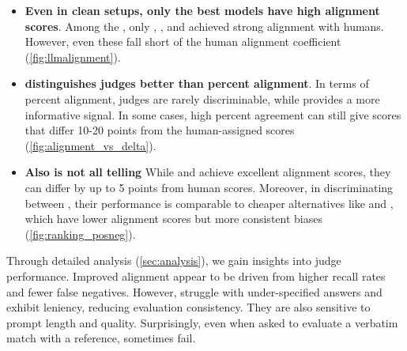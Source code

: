 \begin{itemize}[leftmargin=4pt, topsep=1pt, itemsep=0.1em] %
    \item \textbf{Even in clean setups, only the best models have high alignment scores}. Among the \njudgesword \judgemodels, only \judge{\gpt}, , and  achieved strong alignment with humans. However, even these fall short of the human alignment coefficient (\cref{fig:llmalignment}). %
\\
\item \textbf{\scottspi distinguishes judges better than percent alignment}. In terms of percent alignment, judges are rarely discriminable, while \scottspi provides a more informative signal. In some cases, high percent agreement can still give scores that differ 10-20 points from the human-assigned scores (\cref{fig:alignment_vs_delta}). %

\item \textbf{Also \scottspi is not all telling} While \judge{\gpt} and  achieve excellent alignment scores, they can differ by up to 5 points from human scores. Moreover, in discriminating between \evaluatormodels, their performance is comparable to cheaper alternatives like  and , which have lower alignment scores but more consistent biases (\cref{fig:ranking_posneg}).


\end{itemize}

Through detailed analysis (\cref{sec:analysis}), we gain insights into judge performance. Improved alignment appear to be driven from higher recall rates and fewer false negatives. However, \judgemodels struggle with under-specified answers and exhibit leniency, reducing evaluation consistency. They are also sensitive to prompt length and quality. Surprisingly, even when asked to evaluate a verbatim match with a reference, \judgemodels sometimes fail.

